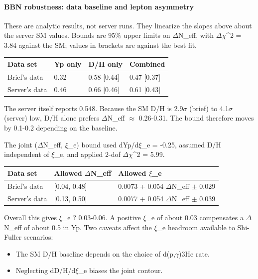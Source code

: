 \documentclass[11pt,a4paper]{article}
\begin{document}
\paragraph{BBN robustness: data baseline and lepton asymmetry}
These are analytic results, not server runs. They linearize the slopes above about the server SM values. Bounds are 95\% upper limits on $\Delta$N\_eff, with $\Delta$$\chi$\textasciicircum{}2 = 3.84 against the SM; values in brackets are against the best fit.

\begin{longtable}{@{}p{}p{}p{}p{}@{}}
\toprule
\textbf{Data set} & \textbf{Yp only} & \textbf{D/H only} & \textbf{Combined} \\ \midrule \endhead
Brief's data & 0.32 & 0.58 [0.44] & 0.47 [0.37] \\
Server's data & 0.46 & 0.66 [0.46] & 0.61 [0.43] \\
\bottomrule\end{longtable}
The server itself reports 0.548. Because the SM D/H is 2.9$\sigma$ (brief) to 4.1$\sigma$ (server) low, D/H alone prefers $\Delta$N\_eff $\approx$ 0.26-0.31. The bound therefore moves by 0.1-0.2 depending on the baseline.

The joint ($\Delta$N\_eff, $\xi$\_e) bound used dYp/d$\xi$\_e = -0.25, assumed D/H independent of $\xi$\_e, and applied 2-dof $\Delta$$\chi$\textasciicircum{}2 = 5.99.

\begin{longtable}{@{}p{}p{}p{}@{}}
\toprule
\textbf{Data set} & \textbf{Allowed $\Delta$N\_eff} & \textbf{Allowed $\xi$\_e} \\ \midrule \endhead
Brief's data & [0.04, 0.48] & 0.0073 + 0.054 $\Delta$N\_eff $\pm$ 0.029 \\
Server's data & [0.13, 0.50] & 0.0077 + 0.054 $\Delta$N\_eff $\pm$ 0.039 \\
\bottomrule\end{longtable}
Overall this gives \textbar{}$\xi$\_e\textbar{} ? 0.03-0.06. A positive $\xi$\_e of about 0.03 compensates a $\Delta$N\_eff of about 0.5 in Yp. Two caveats affect the $\xi$\_e headroom available to Shi-Fuller scenarios:

\begin{itemize}
  \item The SM D/H baseline depends on the choice of d(p,$\gamma$)3He rate.
  \item Neglecting dD/H/d$\xi$\_e biases the joint contour.
\end{itemize}
\end{document}
